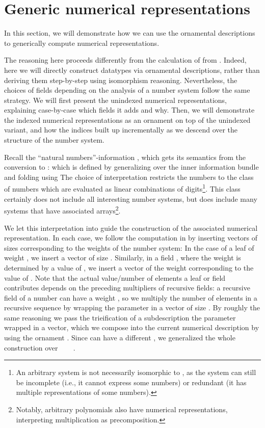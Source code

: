 \section{Generic numerical representations}\label{sec:trieo}
In this section, we will demonstrate how we can use the ornamental descriptions to generically compute numerical representations. 

The reasoning here proceeds differently from the calculation of  from \bN{}. Indeed, here we will directly construct datatypes via ornamental descriptions, rather than deriving them step-by-step using isomorphism reasoning. Nevertheless, the choices of fields depending on the analysis of a number system follow the same strategy. We will first present the unindexed numerical representations, explaining case-by-case which fields it adds and why. Then, we will demonstrate the indexed numerical representations as an ornament on top of the unindexed variant, and how the indices built up incrementally as we descend over the structure of the number system.

Recall the ``natural numbers''-information , which gets its semantics from the conversion to \bN{}:
which is defined by generalizing over the inner information bundle and folding using
The choice of interpretation restricts the numbers to the class of numbers which are evaluated as linear combinations of digits\footnote{An arbitrary  system is not necessarily isomorphic to \bN{}, as the system can still be incomplete (i.e., it cannot express some numbers) or redundant (it has multiple representations of some numbers).}. This class certainly does not include all interesting number systems, but does include many systems that have associated arrays\footnote{Notably, arbitrary polynomials also have numerical representations, interpreting multiplication as precomposition.}. 

We let this interpretation into \bN{} guide the construction of the associated numerical representation. In each case, we follow the computation in  by inserting vectors of sizes corresponding to the weights of the number system:
In the case of a leaf  of weight , we insert a vector of size . Similarly, in a field , where the weight is determined by a value  of , we insert a vector of the weight corresponding to the value of . Note that the actual value/number of elements a leaf or field contributes depends on the preceding multipliers of recursive fields: a recursive field of a number can have a weight , so we multiply the number of elements in a recursive sequence by wrapping the parameter in a vector of size . By roughly the same reasoning we pass the trieification of a subdescription  the parameter wrapped in a vector, which we compose into the current numerical description by using the ornament . Since  can have a different , we generalized the whole construction over \ \AV{:} \ \ .

